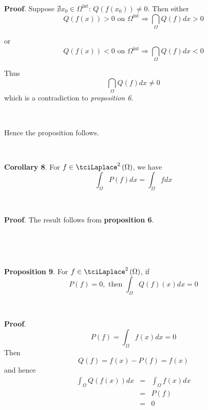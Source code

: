 \documentclass{amsproc}
\theoremstyle{plain}
\numberwithin{equation}{section}
\begin{document}
\ \ 

\textbf{Proof}. Suppose $\nexists x_{0}\in \Omega ^{\text{int}}$: $Q\left(
f\left( x_{0}\right) \right) \neq 0$. Then either 
\begin{equation*}
Q\left( f\left( x\right) \right) >0\text{ \ \ on \ \ }\Omega ^{\text{int}}\Longrightarrow \dint\limits_{\Omega }Q\left( f\right) dx>0
\end{equation*}

or 
\begin{equation*}
Q\left( f\left( x\right) \right) <0\text{ \ on \ \ }\Omega ^{\text{int}}\Longrightarrow \dint\limits_{\Omega }Q\left( f\right) dx<0
\end{equation*}

Thus\begin{equation*}
\dint\limits_{\Omega }Q\left( f\right) dx\neq 0
\end{equation*}which is a contradiction to \textit{proposition 6}.

\ \ \ \ 

Hence the proposition follows.

\ \ \ \ \ 

\textbf{Corollary 8}. For $f\in \tciLaplace ^{2}\left( \Omega \right) $, we
have 
\begin{equation*}
\int_{\Omega }P\left( f\right) dx=\int_{\Omega }fdx
\end{equation*}

\ \ \ \ \ \ 

\textbf{Proof}. The result follows from \textbf{proposition 6}.

\ \ \ \ \ \ \ 

\ \ \ \ \ \ 

\textbf{Proposition 9}. For $f\in \tciLaplace ^{2}\left( \Omega \right) $,
if 
\begin{equation*}
P(f)=0,\text{ then }\int_{\Omega }Q(f)(x)dx=0
\end{equation*}

\ 

\textbf{Proof}. \ 
\begin{equation*}
P(f)=\int_{\Omega }f(x)dx=0
\end{equation*}Then 
\begin{equation*}
Q(f)=f(x)-P(f)=f(x)
\end{equation*}and hence 
\begin{eqnarray*}
\int_{\Omega }Q(f(x))dx &=&\int_{\Omega }f(x)dx \\
&=&P(f) \\
&=&0
\end{eqnarray*}
\end{document}

